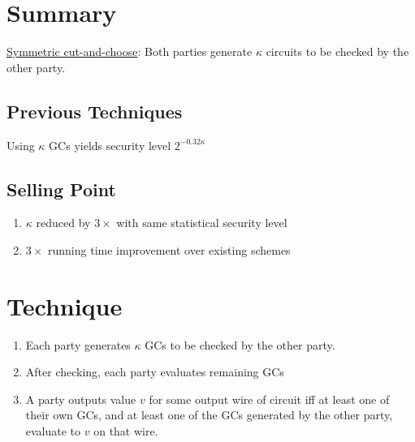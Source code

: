 
\clearpage
{}

%
\setcounter{section}{0} %

\section{Summary}

\underline{Symmetric cut-and-choose}: Both parties generate $\kappa$ circuits to be checked by the other party. 

\subsection{Previous Techniques}
Using $\kappa$ GCs yields security level $2^{-0.32\kappa}$

\subsection{Selling Point}
\begin{enumerate}
    \item $\kappa$ reduced by $3 \times$ with same statistical security level 
    \item $3 \times$ running time improvement over existing schemes 
\end{enumerate}

\section{Technique}
\begin{enumerate}
    \item Each party generates $\kappa$ GCs to be checked by the other party.
    \item After checking, each party evaluates remaining GCs
    \item A party outputs value $v$ for some output wire of circuit iff at least one of their own GCs, and at least one of the GCs generated by the other party, evaluate to $v$ on that wire.
\end{enumerate}

